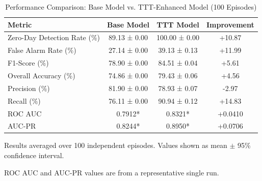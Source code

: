 \begin{table}[htbp]
\centering
\caption{Performance Comparison: Base Model vs. TTT-Enhanced Model (100 Episodes)}
\label{tab:performance}
\begin{tabular}{lccc}
\hline
Metric & Base Model & TTT Model & Improvement \\
\hline
Zero-Day Detection Rate (\%) & 89.13 ± 0.00 & 100.00 ± 0.00 & +10.87 \\
False Alarm Rate (\%) & 27.14 ± 0.00 & 39.13 ± 0.13 & +11.99 \\
F1-Score (\%) & 78.90 ± 0.00 & 84.51 ± 0.04 & +5.61 \\
Overall Accuracy (\%) & 74.86 ± 0.00 & 79.43 ± 0.06 & +4.56 \\
Precision (\%) & 81.90 ± 0.00 & 78.93 ± 0.07 & -2.97 \\
Recall (\%) & 76.11 ± 0.00 & 90.94 ± 0.12 & +14.83 \\
ROC AUC & 0.7912* & 0.8321* & +0.0410 \\
AUC-PR & 0.8244* & 0.8950* & +0.0706 \\
\hline
\end{tabular}
\begin{tablenotes}
\small
\item Results averaged over 100 independent episodes. Values shown as mean $\pm$ 95\% confidence interval.
\item * ROC AUC and AUC-PR values are from a representative single run.
\end{tablenotes}
\end{table}
